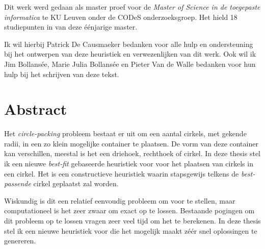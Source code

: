 \documentclass[12pt,a4paper,oneside]{book}
\begin{document}
Dit werk werd gedaan als master proef voor de \textit{Master of Science in de toegepaste informatica} te KU Leuven onder de CODeS onderzoeksgroep.
Het hield 18 studiepunten in van deze éénjarige master.

Ik wil hierbij Patrick De Causmaeker bedanken voor alle hulp en ondersteuning bij het ontwerpen van deze heuristiek en verwezenlijken van dit werk.
Ook wil ik Jim Bollansée, Marie Julia Bollansée en Pieter Van de Walle bedanken voor hun hulp bij het schrijven van deze tekst.


\newpage

\chapter*{Abstract}


Het \textit{circle-packing} probleem bestaat er uit om een aantal cirkels, met gekende radii, in een zo klein mogelijke container te plaatsen.
De vorm van deze container kan verschillen, meestal is het een driehoek, rechthoek of cirkel.
In deze thesis stel ik een nieuwe \textit{best-fit} gebaseerde heuristiek voor voor het plaatsen van cirkels in een cirkel.
Het is een constructieve heuristiek waarin stapsgewijs telkens de \textit{best-passende} cirkel geplaatst zal worden.

Wiskundig is dit een relatief eenvoudig probleem om voor te stellen, maar computationeel is het zeer zwaar om exact op te lossen.
Bestaande pogingen om dit probleem op te lossen vragen zeer veel tijd om het te berekenen.
In deze thesis stel ik een nieuwe heuristiek voor die het mogelijk maakt zéér snel oplossingen te genereren.
\end{document}
